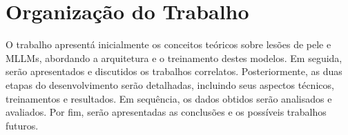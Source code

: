 \section{Organização do Trabalho}

O trabalho apresentá inicialmente os conceitos teóricos sobre lesões de pele e \acp{MLLM}, abordando a arquitetura e o
treinamento destes modelos. Em seguida, serão apresentados e discutidos os trabalhos correlatos. Posteriormente, as
duas etapas do desenvolvimento serão detalhadas, incluindo seus aspectos técnicos, treinamentos e resultados. Em
sequência, os dados obtidos serão analisados e avaliados. Por fim, serão apresentadas as conclusões e os possíveis
trabalhos futuros.

